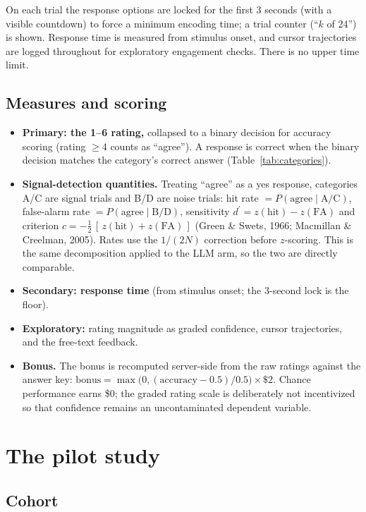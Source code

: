 \documentclass[11pt]{article}
\newcommand{\dpr}{d^{\prime}}
\begin{document}
On each trial the response options are locked for the first 3 seconds (with a visible
countdown) to force a minimum encoding time; a trial counter (``$k$ of 24'') is shown.
Response time is measured from stimulus onset, and cursor trajectories are logged throughout
for exploratory engagement checks. There is no upper time limit.

\subsection{Measures and scoring}\label{sec:measures}

\begin{itemize}
\item \textbf{Primary: the 1--6 rating,} collapsed to a binary decision for accuracy scoring
(rating $\geq 4$ counts as ``agree''). A response is correct when the binary decision matches
the category's correct answer (Table~\ref{tab:categories}).
\item \textbf{Signal-detection quantities.} Treating ``agree'' as a yes response, categories
A/C are signal trials and B/D are noise trials: hit rate $=P(\text{agree}\mid \text{A/C})$,
false-alarm rate $=P(\text{agree}\mid \text{B/D})$, sensitivity
$\dpr = z(\text{hit}) - z(\text{FA})$ and criterion
$c = -\tfrac{1}{2}\,[\,z(\text{hit}) + z(\text{FA})\,]$ (Green \& Swets, 1966; Macmillan \&
Creelman, 2005). Rates use the $1/(2N)$ correction before $z$-scoring. This is the same
decomposition applied to the LLM arm, so the two are directly comparable.
\item \textbf{Secondary: response time} (from stimulus onset; the 3-second lock is the floor).
\item \textbf{Exploratory:} rating magnitude as graded confidence, cursor trajectories, and
the free-text feedback.
\item \textbf{Bonus.} The bonus is recomputed server-side from the raw ratings against the
answer key: $\text{bonus} = \max\!\big(0, (\text{accuracy} - 0.5)/0.5\big) \times \$2$. Chance
performance earns \$0; the graded rating scale is deliberately not incentivized so that
confidence remains an uncontaminated dependent variable.
\end{itemize}

\section{The pilot study}\label{sec:pilot}

\subsection{Cohort}\label{sec:pilot-cohort}
\end{document}
